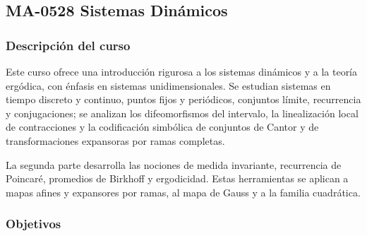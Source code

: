 \newpage
\subsection*{MA-0528 Sistemas Dinámicos}

\hypertarget{MA0528}{}
\begin{refsection}
\begin{table}[H]
\end{table}

\subsubsection*{Descripción del curso}

Este curso ofrece una introducción rigurosa a los sistemas dinámicos y a la teoría ergódica, con énfasis en sistemas unidimensionales. Se estudian sistemas en tiempo discreto y continuo, puntos fijos y periódicos, conjuntos límite, recurrencia y conjugaciones; se analizan los difeomorfismos del intervalo, la linealización local de contracciones y la codificación simbólica de conjuntos de Cantor y de transformaciones expansoras por ramas completas.

La segunda parte desarrolla las nociones de medida invariante, recurrencia de Poincaré, promedios de Birkhoff y ergodicidad. Estas herramientas se aplican a mapas afines y expansores por ramas, al mapa de Gauss y a la familia cuadrática.

\subsubsection*{Objetivos}


\end{refsection}
